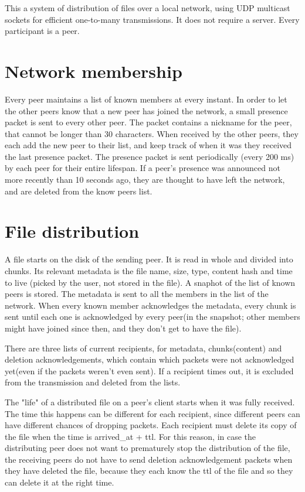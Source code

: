 This a system of distribution of files over a local network, using UDP multicast sockets for efficient one-to-many transmissions. It does not require a server. Every participant is a peer.

\section{Network membership}
Every peer maintains a list of known members at every instant.
In order to let the other peers know that a new peer has joined the network, a small presence packet is sent to every other peer. The packet contains a nickname for the peer, that cannot be longer than 30 characters. When received by the other peers, they each add the new peer to their list, and keep track of when it was they received the last presence packet. The presence packet is sent periodically (every 200 ms) by each peer for their entire lifespan. If a peer's presence was announced not more recently than 10 seconds ago, they are thought to have left the network, and are deleted from the know peers list.

\section{File distribution}
A file starts on the disk of the sending peer. It is read in whole and divided into chunks. Its relevant metadata is the file name, size, type, content hash and time to live (picked by the user, not stored in the file). A snaphot of the list of known peers is stored. The metadata is sent to all the members in the list of the network. When every known member acknowledges the metadata, every chunk is sent until each one is acknowledged by every peer(in the snapshot; other members might have joined since then, and they don't get to have the file).

There are three lists of current recipients, for metadata, chunks(content) and deletion acknowledgements, which contain which packets were not acknowledged yet(even if the packets weren't even sent). If a recipient times out, it is excluded from the transmission and deleted from the lists.

The "life" of a distributed file on a peer's client starts when it was fully received. The time this happens can be different for each recipient, since different peers can have different chances of dropping packets. Each recipient must delete its copy of the file when the time is arrived_at + ttl. For this reason, in case the distributing peer does not want to prematurely stop the distribution of the file, the receiving peers do not have to send deletion acknowledgement packets when they have deleted the file, because they each know the ttl of the file and so they can delete it at the right time.

